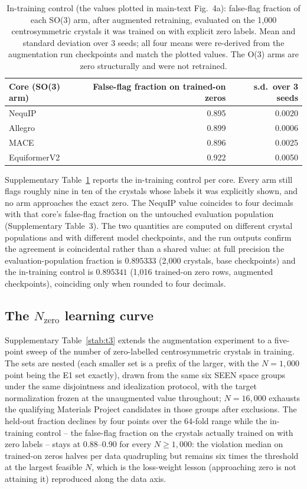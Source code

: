 \begin{table}[htbp]
\centering
\caption{In-training control (the values plotted in main-text Fig.~4a): false-flag fraction of each SO(3) arm, after augmented retraining, evaluated on the 1,000 centrosymmetric crystals it was trained on with explicit zero labels. Mean and standard deviation over 3 seeds; all four means were re-derived from the augmentation run checkpoints and match the plotted values. The O(3) arms are zero structurally and were not retrained.}
\label{stab:intraining}
\scriptsize
\begin{tabular}{@{}lrr@{}}
\toprule
Core (SO(3) arm) & False-flag fraction on trained-on zeros & s.d.\ over 3 seeds \\
\midrule
NequIP & 0.895 & 0.0020 \\
Allegro & 0.899 & 0.0006 \\
MACE & 0.896 & 0.0025 \\
EquiformerV2 & 0.922 & 0.0050 \\
\bottomrule
\end{tabular}
\end{table}

Supplementary Table~\ref{stab:intraining} reports the in-training control per core. Every arm still flags roughly nine in ten of the crystals whose labels it was explicitly shown, and no arm approaches the exact zero. The NequIP value coincides to four decimals with that core's false-flag fraction on the untouched evaluation population (Supplementary Table~3). The two quantities are computed on different crystal populations and with different model checkpoints, and the run outputs confirm the agreement is coincidental rather than a shared value: at full precision the evaluation-population fraction is $0.895333$ (2,000 crystals, base checkpoints) and the in-training control is $0.895341$ (1,016 trained-on zero rows, augmented checkpoints), coinciding only when rounded to four decimals.

\subsection*{The $N_{\mathrm{zero}}$ learning curve}

Supplementary Table~\ref{stab:t3} extends the augmentation experiment to a five-point sweep of the number of zero-labelled centrosymmetric crystals in training. The sets are nested (each smaller set is a prefix of the larger, with the $N{=}1{,}000$ point being the E1 set exactly), drawn from the same six SEEN space groups under the same disjointness and idealization protocol, with the target normalization frozen at the unaugmented value throughout; $N{=}16{,}000$ exhausts the qualifying Materials Project candidates in those groups after exclusions. The held-out fraction declines by four points over the 64-fold range while the in-training control -- the false-flag fraction on the crystals actually trained on with zero labels -- stays at $0.88$--$0.90$ for every $N \geq 1{,}000$: the violation median on trained-on zeros halves per data quadrupling but remains six times the threshold at the largest feasible $N$, which is the loss-weight lesson (approaching zero is not attaining it) reproduced along the data axis.

